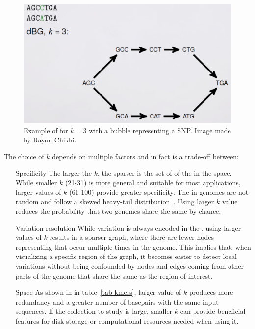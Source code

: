 \begin{figure}[h!]
	\centering
	\includegraphics[width=.95\linewidth]{figures/background/dbg.png}
	\caption[Example of \dbg.]{Example of \dbg for $k=3$ with a bubble representing a SNP. Image made by Rayan Chikhi.}
	\label{fig:dbg_ex}
\end{figure}
The choice of $k$ depends on multiple factors and in fact is a trade-off between: 
\begin{itemize}
	\item[Specificity] The larger the $k$, the sparser is the set of \kmers of the \dbg in the space. While smaller $k$ (21-31) is more general and suitable for most applications, larger values of $k$ (61-100) provide greater specificity. The \kmers in genomes are not random and follow a skewed heavy-tail distribution~\cite{chor2009genomic}. Using larger $k$ value reduces the probability that two genomes share the same \kmer by chance.
	\item[Variation resolution]While variation is always encoded in the \dbg, using larger values of $k$ results in a sparser graph, where there are fewer nodes representing \kmers that occur multiple times in the genome. This implies that, when visualizing a specific region of the graph, it becomes easier to detect local variations without being confounded by nodes and edges coming from other parts of the genome that share the same \kmers as the region of interest.
	\item[Space] As shown in in table~\ref{tab-kmers}, larger value of $k$ produces more redundancy and a greater number of basepairs with the same input sequences. If the collection to study is large, smaller $k$ can provide beneficial features for disk storage or computational resources needed when using it.
\end{itemize}
